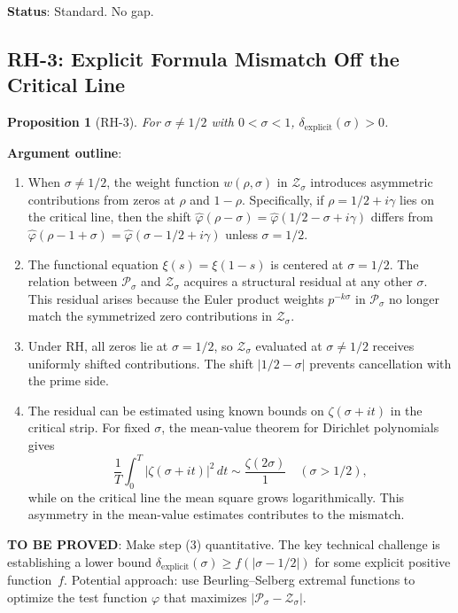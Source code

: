 \documentclass[11pt]{article}
\newtheorem{proposition}[theorem]{Proposition}
\theoremstyle{remark}
\begin{document}
\noindent\textbf{Status}: Standard.  No gap.

\subsection{RH-3: Explicit Formula Mismatch Off the Critical Line}
\label{subsec:RH3}

\begin{proposition}[RH-3]
For $\sigma\neq 1/2$ with $0<\sigma<1$, $\delta_{\mathrm{explicit}}(\sigma)>0$.
\end{proposition}

\noindent\textbf{Argument outline}:
\begin{enumerate}
  \item When $\sigma\neq 1/2$, the weight function $w(\rho,\sigma)$ in
    $\mathcal{Z}_\sigma$ introduces asymmetric contributions from zeros at
    $\rho$ and $1-\rho$.
    Specifically, if $\rho=1/2+i\gamma$ lies on the critical line, then
    the shift $\hat{\varphi}(\rho-\sigma)=\hat{\varphi}(1/2-\sigma+i\gamma)$
    differs from $\hat{\varphi}(\rho-1+\sigma)=\hat{\varphi}(\sigma-1/2+i\gamma)$
    unless $\sigma=1/2$.

  \item The functional equation $\xi(s)=\xi(1-s)$ is centered at $\sigma=1/2$.
    The relation between $\mathcal{P}_\sigma$ and $\mathcal{Z}_\sigma$ acquires
    a structural residual at any other $\sigma$.
    This residual arises because the Euler product weights $p^{-k\sigma}$ in
    $\mathcal{P}_\sigma$ no longer match the symmetrized zero contributions
    in $\mathcal{Z}_\sigma$.

  \item Under RH, all zeros lie at $\sigma=1/2$, so $\mathcal{Z}_\sigma$
    evaluated at $\sigma\neq 1/2$ receives uniformly shifted contributions.
    The shift $|1/2-\sigma|$ prevents cancellation with the prime side.

  \item The residual can be estimated using known bounds on $\zeta(\sigma+it)$ in the
    critical strip.
    For fixed $\sigma$, the mean-value theorem for Dirichlet polynomials gives
    \[
      \frac{1}{T}\int_0^T |\zeta(\sigma+it)|^2\,dt \sim \frac{\zeta(2\sigma)}{1}
      \quad(\sigma>1/2),
    \]
    while on the critical line the mean square grows logarithmically.
    This asymmetry in the mean-value estimates contributes to the mismatch.
\end{enumerate}

\textbf{TO BE PROVED}: Make step (3) quantitative.
The key technical challenge is establishing a lower bound
$\delta_{\mathrm{explicit}}(\sigma)\geq f(|\sigma-1/2|)$ for some explicit positive
function~$f$.
Potential approach: use Beurling--Selberg extremal functions to optimize the test
function $\varphi$ that maximizes $|\mathcal{P}_\sigma-\mathcal{Z}_\sigma|$.
\end{document}
